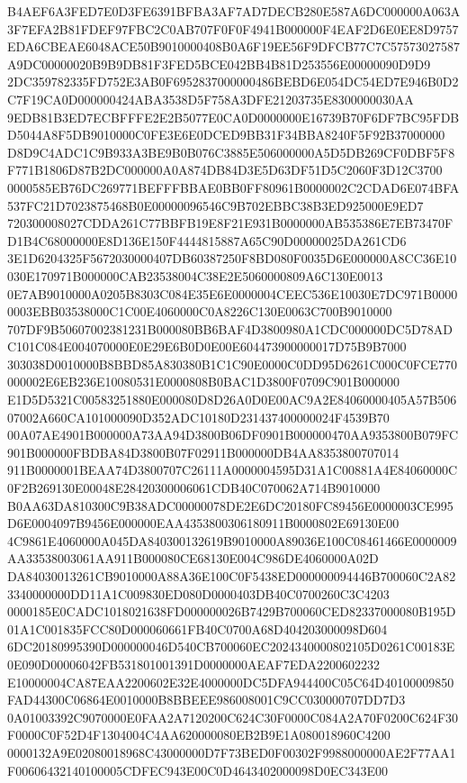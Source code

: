 \documentclass[UTF8,fontset=fandol,zihao=-4,a4paper]{ctexart}
\begin{document}
{{B4AEF6A3FED7E0D3FE6391BFBA3AF7AD7DECB280E587A6DC000000A063A3F7EFA2B81FDEF97FBC2C0AB707F0F0F4941B000000F4EAF2D6E0EE8D9757
EDA6CBEAE6048ACE50B9010000408B0A6F19EE56F9DFCB77C7C57573027587A9DC00000020B9B9DB81F3FED5BCE042BB4B81D253556E00000090D9D9
2DC359782335FD752E3AB0F6952837000000486BEBD6E054DC54ED7E946B0D2C7F19CA0D000000424ABA3538D5F758A3DFE21203735E8300000030AA
9EDB81B3ED7ECBFFFE2E2B5077E0CA0D0000000E16739B70F6DF7BC95FDBD5044A8F5DB9010000C0FE3E6E0DCED9BB31F34BBA8240F5F92B37000000
D8D9C4ADC1C9B933A3BE9B0B076C3885E506000000A5D5DB269CF0DBF5F8F771B1806D87B2DC000000A0A874DB84D3E5D63DF51D5C2060F3D12C3700
0000585EB76DC269771BEFFFBBAE0BB0FF80961B0000002C2CDAD6E074BFA537FC21D7023875468B0E00000096546C9B702EBBC38B3ED925000E9ED7
720300008027CDDA261C77BBFB19E8F21E931B0000000AB535386E7EB73470FD1B4C68000000E8D136E150F4444815887A65C90D00000025DA261CD6
3E1D6204325F5672030000407DB60387250F8BD080F0035D6E000000A8CC36E10030E170971B000000CAB23538004C38E2E5060000809A6C130E0013
0E7AB9010000A0205B8303C084E35E6E0000004CEEC536E10030E7DC971B00000003EBB03538000C1C00E4060000C0A8226C130E0063C700B9010000
707DF9B50607002381231B000080BB6BAF4D3800980A1CDC000000DC5D78ADC101C084E004070000E0E29E6B0D0E00E604473900000017D75B9B7000
303038D0010000B8BBD85A830380B1C1C90E0000C0DD95D6261C000C0FCE770000002E6EB236E10080531E0000808B0BAC1D3800F0709C901B000000
E1D5D5321C00583251880E000080D8D26A0D0E00AC9A2E84060000405A57B50607002A660CA101000090D352ADC10180D231437400000024F4539B70
00A07AE4901B000000A73AA94D3800B06DF0901B000000470AA9353800B079FC901B000000FBDBA84D3800B07F02911B000000DB4AA8353800707014
911B0000001BEAA74D3800707C26111A0000004595D31A1C00881A4E84060000C0F2B269130E00048E28420300006061CDB40C070062A714B9010000
B0AA63DA810300C9B38ADC00000078DE2E6DC20180FC89456E0000003CE995D6E0004097B9456E000000EAA4353800306180911B0000802E69130E00
4C9861E4060000A045DA840300132619B9010000A89036E100C08461466E0000009AA33538003061AA911B000080CE68130E004C986DE4060000A02D
DA84030013261CB9010000A88A36E100C0F5438ED000000094446B700060C2A823340000000DD11A1C009830ED080D0000403DB40C0700260C3C4203
0000185E0CADC1018021638FD000000026B7429B700060CED82337000080B195D01A1C001835FCC80D000060661FB40C0700A68D404203000098D604
6DC20180995390D000000046D540CB700060EC2024340000802105D0261C00183E0E090D00006042FB531801001391D0000000AEAF7EDA2200602232
E10000004CA87EAA2200602E32E4000000DC5DFA944400C05C64D40100009850FAD44300C06864E0010000B8BBEEE986008001C9CC030000707DD7D3
0A01003392C9070000E0FAA2A7120200C624C30F0000C084A2A70F0200C624F30F0000C0F52D4F1304004C4AA620000080EB2B9E1A080018960C4200
0000132A9E02080018968C43000000D7F73BED0F00302F9988000000AE2F77AA1F00606432140100005CDFEC943E00C0D4643402000098D0EC343E00
}}
\end{document}
